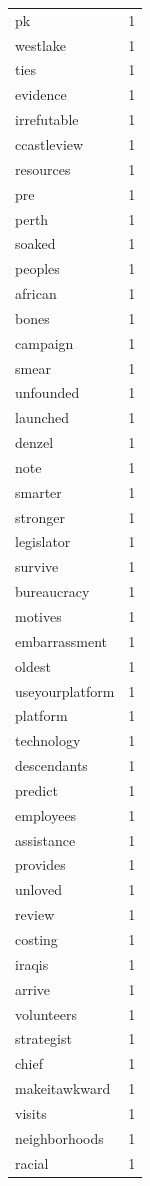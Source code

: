 \begin{tabular}{lr}
pk & 1 \\
westlake & 1 \\
ties & 1 \\
evidence & 1 \\
irrefutable & 1 \\
ccastleview & 1 \\
resources & 1 \\
pre & 1 \\
perth & 1 \\
soaked & 1 \\
peoples & 1 \\
african & 1 \\
bones & 1 \\
campaign & 1 \\
smear & 1 \\
unfounded & 1 \\
launched & 1 \\
denzel & 1 \\
note & 1 \\
smarter & 1 \\
stronger & 1 \\
legislator & 1 \\
survive & 1 \\
bureaucracy & 1 \\
motives & 1 \\
embarrassment & 1 \\
oldest & 1 \\
useyourplatform & 1 \\
platform & 1 \\
technology & 1 \\
descendants & 1 \\
predict & 1 \\
employees & 1 \\
assistance & 1 \\
provides & 1 \\
unloved & 1 \\
review & 1 \\
costing & 1 \\
iraqis & 1 \\
arrive & 1 \\
volunteers & 1 \\
strategist & 1 \\
chief & 1 \\
makeitawkward & 1 \\
visits & 1 \\
neighborhoods & 1 \\
racial & 1 \\

\end{tabular}
